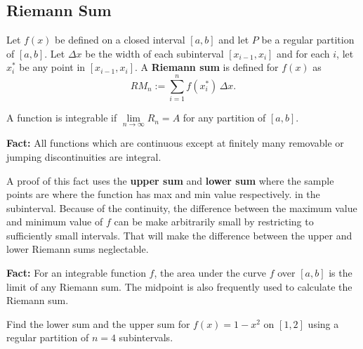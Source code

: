 \hypertarget{riemann-sum}{%
\subsection{Riemann Sum}\label{riemann-sum}}

\begin{definition}

Let \(f(x)\) be defined on a closed interval \([a,b]\) and let \(P\) be
a regular partition of \([a,b]\). Let \(\Delta x\) be the width of each
subinterval \([x_{i - 1},x_i]\) and for each \(i\), let \(x^*_i\) be any
point in \([x_{i - 1},x_i]\). A \textbf{Riemann sum} is defined for
\(f(x)\) as \[RM_n:=\sum\limits_{i=1}^nf(x^*_i)\,\Delta x.\]

\end{definition}

\begin{definition}

A function is integrable if \(\lim\limits_{n\to \infty}R_n=A\) for any
partition of \([a, b]\).

\end{definition}

\textbf{Fact:} All functions which are continuous except at finitely
many removable or jumping discontinuities are integral.

A proof of this fact uses the \textbf{upper sum} and \textbf{lower sum}
where the sample points are where the function has max and min value
respectively. in the subinterval. Because of the continuity, the
difference between the maximum value and minimum value of \(f\) can be
make arbitrarily small by restricting to sufficiently small intervals.
That will make the difference between the upper and lower Riemann sums
neglectable.


\textbf{Fact:} For an integrable function \(f\), the area under the
curve \(f\) over \([a, b]\) is the limit of any Riemann sum. The
midpoint is also frequently used to calculate the Riemann sum.

\begin{example}

Find the lower sum and the upper sum for \(f(x)=1 - x^2\) on \([1,2]\)
using a regular partition of \(n=4\) subintervals.

\end{example}
\vspace*{6\baselineskip}


